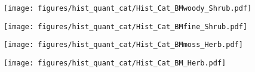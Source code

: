 \begin{multicols}{3}
    \begin{minipage}{\columnwidth}
        \begin{figure}[H]
            \texttt{[image: figures/hist\_quant\_cat/Hist\_Cat\_BMwoody\_Shrub.pdf]}
        \end{figure} 
    \end{minipage}
    
    \begin{minipage}{\columnwidth}
        \begin{figure}[H]
            \texttt{[image: figures/hist\_quant\_cat/Hist\_Cat\_BMfine\_Shrub.pdf]}
        \end{figure} 
    \end{minipage}
    
    \begin{minipage}{\columnwidth}
        \begin{figure}[H]
            \hspace{0.8cm}\centering
            \texttt{[image: figures/hist\_quant\_cat/Hist\_Cat\_BMmoss\_Herb.pdf]}
        \end{figure} 
    \end{minipage}

    \begin{minipage}{\columnwidth}
        \begin{figure}[H]
            \hspace{0.8cm}\centering
            \texttt{[image: figures/hist\_quant\_cat/Hist\_Cat\_BM\_Herb.pdf]}
        \end{figure} 
    \end{minipage}
    

\end{multicols}
